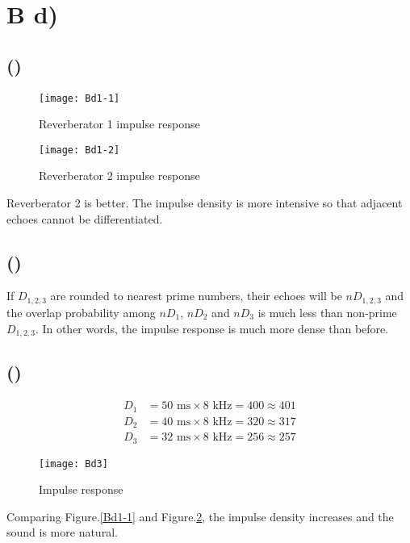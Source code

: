 \documentclass{article}
\newenvironment{homeworkProblem}[1]{
	\section*{#1}
	}{
}
\newenvironment{homeworkSection}[1]{
	\subsection*{#1}
	}{
}
\begin{document}

\begin{homeworkProblem}{B d)}

\begin{homeworkSection}{()}

\begin{figure}[H]
\begin{minipage}[t]{0.5\linewidth}
\centering
\texttt{[image: Bd1-1]}
\caption{Reverberator 1 impulse response}
\label{Bd1-1}
\end{minipage}
\begin{minipage}[t]{0.5\linewidth}
\centering
\texttt{[image: Bd1-2]}
\caption{Reverberator 2 impulse response}
\label{Bd1-2}
\end{minipage}
\end{figure}

Reverberator 2 is better. The impulse density is more intensive so that adjacent echoes cannot be differentiated.

\end{homeworkSection}


\begin{homeworkSection}{()}

If $D_{1,2,3}$ are rounded to nearest prime numbers, their echoes will be $nD_{1,2,3}$ and the overlap probability among $nD_1$, $nD_2$ and $nD_3$ is much less than non-prime $D_{1,2,3}$. In other words, the impulse response is much more dense than before.

\end{homeworkSection}


\begin{homeworkSection}{()}

\begin{align*}
D_1 &= 50\text{ ms} \times 8\text{ kHz} = 400 \approx 401\\
D_2 &= 40\text{ ms} \times 8\text{ kHz} = 320 \approx 317\\
D_3 &= 32\text{ ms} \times 8\text{ kHz} = 256 \approx 257
\end{align*}

\begin{figure}[H]
\centering
\texttt{[image: Bd3]}
\caption{Impulse response}
\label{Bd3}
\end{figure}

Comparing Figure.\ref{Bd1-1} and Figure.\ref{Bd3}, the impulse density increases and the sound is more natural.

\end{homeworkSection}


\end{homeworkProblem}
\end{document}
